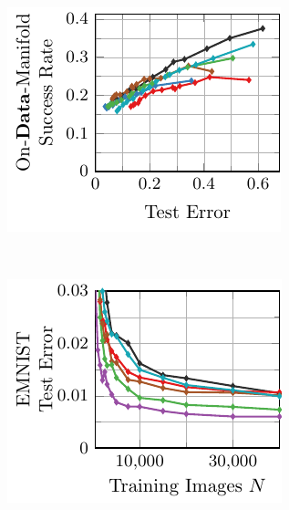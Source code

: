 \begin{appendix}
\begin{figure}[t]
\begin{subfigure}{0.235\textwidth}
        \centering
        \includegraphics[width=\textwidth]{appendix_data_fonts_error_on_learned.pdf}
    \end{subfigure}
    \\
    \begin{subfigure}{0.235\textwidth}
        \centering
        \includegraphics[width=\textwidth]{appendix_data_emnist_error.pdf}
    \end{subfigure}
    \begin{subfigure}{0.235\textwidth}
        \centering

\end{subfigure}
\end{figure}
\end{appendix}

